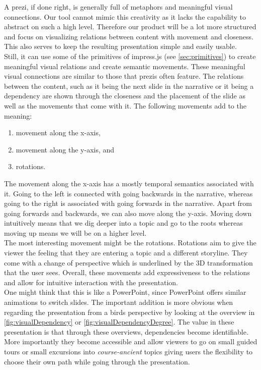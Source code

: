 \documentclass[twoside, 12pt]{article}
\begin{document}
A prezi, if done right, is generally full of metaphors and meaningful visual connections. Our tool cannot mimic this creativity as it lacks the capability to abstract on such a high level. Therefore our product will be a lot more structured and focus on visualizing relations between content with movement and closeness. This also serves to keep the resulting presentation simple and easily usable.\\

Still, it can use some of the primitives of impress.js (see \autoref{sec:primitives}) to create meaningful visual relations and create semantic movements. These meaningful visual connections are similar to those that prezis often feature. The relations between the content, such as it being the next slide in the narrative or it being a dependency are shown through the closeness and the placement of the slide as well as the movements that come with it. The following movements add to the meaning:\\
\vspace{-12pt}
\begin{enumerate}[topsep=0pt,itemsep=-1ex,partopsep=1ex,parsep=1ex]
\item movement along the x-axis,
\item movement along the y-axis, and
\item rotations.
\end{enumerate}
\vspace{5pt}

The movement along the x-axis has a mostly temporal semantics associated with it. Going to the left is connected with going backwards in the narrative, whereas going to the right is associated with going forwards in the narrative. Apart from going forwards and backwards, we can also move along the y-axis. Moving down intuitively means that we dig deeper into a topic and go to the roots whereas moving up means we will be on a higher level.\\

The most interesting movement might be the rotations. Rotations aim to give the viewer the feeling that they are entering a topic and a different storyline. They come with a change of perspective which is underlined by the 3D transformation that the user sees. Overall, these movements add expressiveness to the relations and allow for intuitive interaction with the presentation.\\

One might think that this is like a PowerPoint, since PowerPoint offers similar animations to switch slides. The important addition is more obvious when regarding the presentation from a birds perspective by looking at the overview in \autoref{fig:visualDependency} or \autoref{fig:visualDependencyDegree}. The value in these presentation is that through these overviews, dependencies become identifiable. More importantly they become accessible and allow viewers to go on small guided tours or small excursions into \textit{course-ancient} topics giving users the flexibility to choose their own path while going through the presentation.\\
\end{document}
